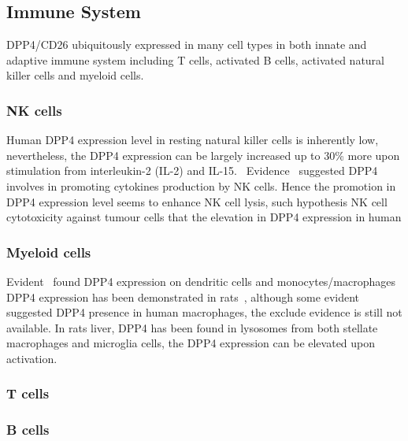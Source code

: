 \subsection{Immune System}
DPP4/CD26 ubiquitously expressed in many cell types in both innate and adaptive immune system including T cells, activated B cells, activated natural killer cells and myeloid cells.~\cite{Abbott1994,Shingu2003,Hong1989,Gutschmidt1981,Dikov2004,Bühling1995,Tanaka1992,Gorrell1991} 

\subsubsection{NK cells}
Human DPP4 expression level in resting natural killer cells is inherently low, nevertheless, the DPP4 expression can be largely increased up to 30\% more upon stimulation from interleukin-2 (IL-2) and IL-15.~\cite{Bühling1994,Biuling1990,Yamabe1997} Evidence~\cite{Madueño1993,Roloff2005} suggested DPP4 involves in promoting cytokines production by NK cells. Hence the promotion in DPP4 expression level seems to enhance NK cell lysis, such hypothesis NK cell cytotoxicity against tumour cells  that the elevation in DPP4 expression in human 

\subsubsection{Myeloid cells}
Evident~\cite{Zhong2013,Gliddon2002} found DPP4 expression on dendritic cells and monocytes/macrophages DPP4 expression has been demonstrated in rats~\cite{Epardaud2004, Ellingsen2007}, although some evident~\cite{Shah_2011} suggested DPP4 presence in human macrophages, the exclude evidence is still not available. In rats liver, DPP4 has been found in lysosomes from both stellate macrophages and microglia cells, the DPP4 expression can be elevated upon activation.~\cite{Fukui1990} 

\subsubsection{T cells}
\subsubsection{B cells}

